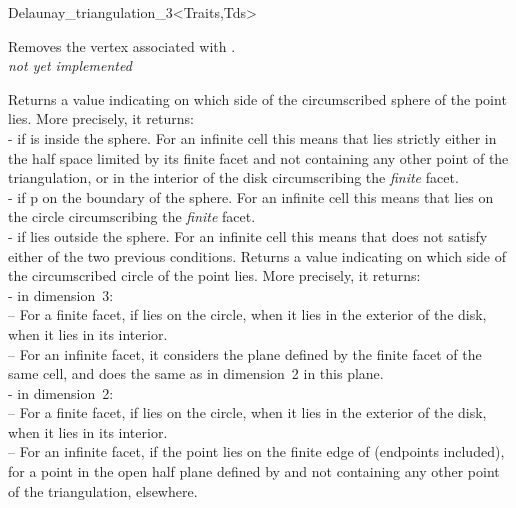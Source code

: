 \begin{ccClassTemplate}{Delaunay_triangulation_3<Traits,Tds>}

{Removes the vertex associated with .
\\
\textit{not yet implemented}}


{Returns a value indicating on which side of the circumscribed sphere
of  the point  lies. More precisely, it returns:\\
-  if  is inside the sphere. For an infinite
cell this means that  lies strictly either in the half space
limited by its finite facet and not containing any other point of the
triangulation, or in the interior of the disk circumscribing the
\textit{finite} facet. \\ 
-  if p on the boundary of the sphere. For an infinite
cell this means that  lies on the circle circumscribing
the \textit{finite} facet.\\ 
-  if  lies outside the sphere. For an
infinite cell this means that  does not satisfy either of the
two previous conditions. 
}
{Returns a value indicating on which side of the circumscribed circle
of  the point  lies. More precisely, it returns:\\
- in dimension~3:\\
-- For a finite facet,  if  lies
on the circle,  when it lies in the exterior of
the disk,  when it lies in its interior.\\
-- For an infinite facet, it considers the plane defined by the finite
facet of the same cell, and does the same as in dimension~2 in this
plane.\\
- in dimension~2:\\
-- For a finite facet,  if  lies
on the circle,  when it lies in the exterior of
the disk,  when it lies in its interior.\\
-- For an infinite facet,  if the
point lies on the finite edge of  (endpoints included),
 for a point in the open half plane defined
by  and not containing any other point of the triangulation,
 elsewhere. 
}


\end{ccClassTemplate}
